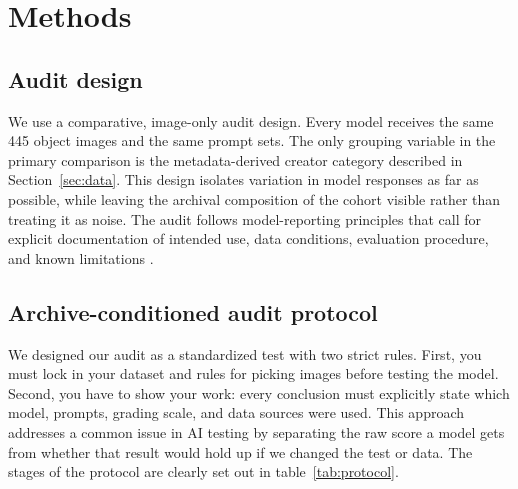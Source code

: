 \documentclass[pdflatex,sn-basic,Numbered]{sn-jnl}
\begin{document}
\section{Methods}
\label{sec:methods}

\subsection{Audit design}

We use a comparative, image-only audit design. Every model receives the same 445 object images and the same prompt sets. The only grouping variable in the primary comparison is the metadata-derived creator category described in Section~\ref{sec:data}. This design isolates variation in model responses as far as possible, while leaving the archival composition of the cohort visible rather than treating it as noise. The audit follows model-reporting principles that call for explicit documentation of intended use, data conditions, evaluation procedure, and known limitations \cite{mitchell2019model}.

\subsection{Archive-conditioned audit protocol}
\label{sec:protocol}

We designed our audit as a standardized test with two strict rules. First, you must lock in your dataset and rules for picking images before testing the model. Second, you have to show your work: every conclusion must explicitly state which model, prompts, grading scale, and data sources were used. This approach addresses a common issue in AI testing by separating the raw score a model gets from whether that result would hold up if we changed the test or data.
The stages of the protocol are clearly set out in table~\ref{tab:protocol}.
\end{document}
